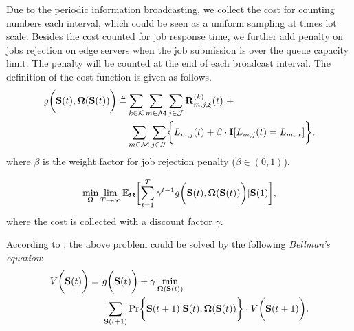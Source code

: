 Due to the periodic information broadcasting, we collect the cost for counting numbers each interval, which could be seen as a uniform sampling at times lot scale.
Besides the cost counted for job response time, we further add penalty on jobs rejection on edge servers when the job submission is over the queue capacity limit. The penalty will be counted at the end of each broadcast interval.
The definition of the cost function is given as follows.
\begin{align}
    g\Paren{\Stat({t}), \Policy(\Stat({t}))} \define
        &\sum_{k\in\apSet} \sum_{m\in\esSet} \sum_{j\in\jSpace} \vec{R}^{(k)}_{m,j,\xi}({t})~+
        \nonumber\\
        &\sum_{m\in\esSet} \sum_{j\in\jSpace} \Brace{L_{m,j}({t}) + \beta \cdot \mat{I}[L_{m,j}({t})=L_{max}]},
\end{align}
where $\beta$ is the weight factor for job rejection penalty ($\beta \in (0,1)$).

\begin{problem}
    \begin{align}
        \min_{\Policy} \lim_{T \to \infty}
            \mathbb{E}_{\Policy}
                \Bracket{\sum_{t=1}^{T} \gamma^{t-1} g\Paren{\Stat({t}), \Policy(\Stat({t}))}|\Stat(1)},
    \end{align}
    where the cost is collected with a discount factor $\gamma$.
\end{problem}
According to \cite{sutton1998introduction}, the above problem could be solved by the following \emph{Bellman's equation}:
\begin{align}
    V\Paren{\Stat({t})} =~&g\Paren{\Stat({t})} + \gamma \min_{\Policy(\Stat({t}))}
        \nonumber\\
        &\sum_{\Stat({t+1})} \Pr\Brace{ \Stat({t+1})|\Stat({t}), \Policy(\Stat({t})) } \cdot V\Paren{\Stat({t+1})}.
    \label{sp_0}
\end{align}

